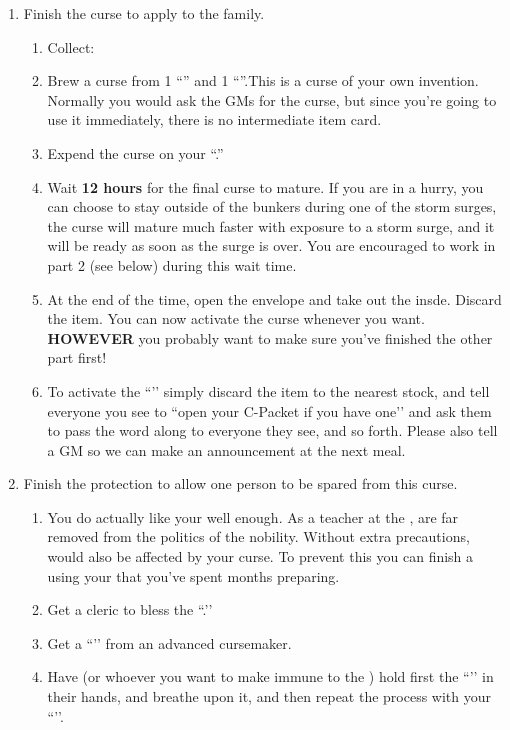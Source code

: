 \documentclass[green]{GL2020}
\begin{document}
\begin{enumerate}
  \item Finish the curse to apply to the \cAdopted{\formal} family.
  \begin{enumerate}
    \item Collect:
    \item Brew a curse from 1 ``\iFlameOrchid{}'' and 1 ``\iObsidian{}''.This is a curse of your own invention. Normally you would ask the GMs for the curse, but since you're going to use it immediately, there is no intermediate item card.
    \item Expend the curse on your ``\iWIPCurse{}.''
    \item Wait \textbf{12 hours} for the final curse to mature. If you are in a hurry, you can choose to stay outside of the bunkers during one of the storm surges, the curse will mature much faster with exposure to a storm surge, and it will be ready as soon as the surge is over. You are encouraged to work in part 2 (see below) during this wait time.
    \item At the end of the time, open the \iWIPCurse{} envelope and take out the \iWithering{} insde. Discard the \iWIPCurse{} item. You can now activate the curse whenever you want. \textbf{HOWEVER} you probably want to make sure you’ve finished the other part first!
    \item To activate the ``\iWithering{}’’ simply discard the item to the nearest stock, and tell everyone you see to ``open your C-Packet if you have one’’ and ask them to pass the word along to everyone they see, and so forth. Please also tell a GM so we can make an announcement at the next meal.
  \end{enumerate}
  \item Finish the protection to allow one person to be spared from this curse.
  \begin{enumerate}
    \item You do actually like your \cMusic{\auncle{}} \cMusic{} well enough. As a teacher at the \pSchool{}, \cMusic{\they} are far removed from the politics of the \pFarm{} nobility. Without extra precautions, \cMusic{} would also be affected by your curse. To prevent this you can finish a \iProtection{} using your \iWIPProtection{} that you’ve spent months preparing.
    \item Get a cleric to bless the ``\iWIPProtection{}.’’
    \item Get a ``\iSlowActingPoisonCure{}’’ from an advanced cursemaker.
    \item Have \cMusic{} (or whoever you want to make immune to the \iWithering{}) hold first the ``\iSlowActingPoisonCure{}’’ in their hands, and breathe upon it, and then repeat the process with your ``\iWIPProtection{}’’.

\end{enumerate}
\end{enumerate}
\end{document}

